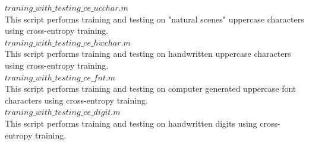 \documentclass[journal,a4paper,onecolumn,11pt]{IEEEtran}
\begin{document}
$traning\_with\_testing\_ce\_ucchar.m$\\
This script performs training and testing on "natural scenes" uppercase characters using cross-entropy training.\\ 
$traning\_with\_testing\_ce\_hwchar.m$\\
This script performs training and testing on handwritten uppercase characters using cross-entropy training.\\ 
$traning\_with\_testing\_ce\_fnt.m$\\
This script performs training and testing on computer generated uppercase font characters using cross-entropy training.\\ 
$traning\_with\_testing\_ce\_digit.m$\\
This script performs training and testing on handwritten digits using cross-entropy training.\\  
\end{document}
